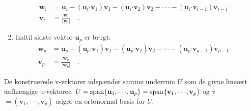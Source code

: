 \begin{method}
\begin{enumerate}
\begin{equation}
\begin{aligned}
\mathbf{w}_{i} &= \mathbf{u}_{i} -  \left(\mathbf{u}_{i} \bm{\cdot} \mathbf{v}_{1}\right)\mathbf{v}_{1} - \left(\mathbf{u}_{i} \bm{\cdot} \mathbf{v}_{2}\right)\mathbf{v}_{2} - \cdot \cdot \cdot -\left(\mathbf{u}_{i} \bm{\cdot} \mathbf{v}_{i-1}\right)\mathbf{v}_{i-1}\\
\mathbf{v}_{i} &= \frac{\mathbf{w}_{i}}{\vert \mathbf{w}_{i} \vert} \quad .
\end{aligned}
\end{equation}
\item Indtil sidste vektor $\mathbf{u}_{p}$ er brugt:
\begin{equation}
\begin{aligned}
\mathbf{w}_{p} &= \mathbf{u}_{p} -  \left(\mathbf{u}_{p} \bm{\cdot} \mathbf{v}_{1}\right)\mathbf{v}_{1} - \left(\mathbf{u}_{p} \bm{\cdot} \mathbf{v}_{2}\right)\mathbf{v}_{2} - \cdots  -\left(\mathbf{u}_{p} \bm{\cdot} \mathbf{v}_{p-1}\right)\mathbf{v}_{p-1}\\
\mathbf{v}_{p} &= \frac{\mathbf{w}_{p}}{\vert \mathbf{w}_{p} \vert} \quad .
\end{aligned}
\end{equation}
\end{enumerate}
De konstruerede v-vektorer udspænder samme underrum $U$ som de givne lineært uafhængige u-vektorer,  $U = \mathrm{span}\{\mathbf{u}_{1}, \cdot  \cdot \cdot, \mathbf{u}_{p} \} = \mathrm{span}\{\mathbf{v}_{1}, \cdot  \cdot \cdot, \mathbf{v}_{p} \} $ og v $= ( \mathbf{v}_{1}, \cdot  \cdot \cdot, \mathbf{v}_{p})$ udgør en ortonormal basis for $U$.
\end{method}


